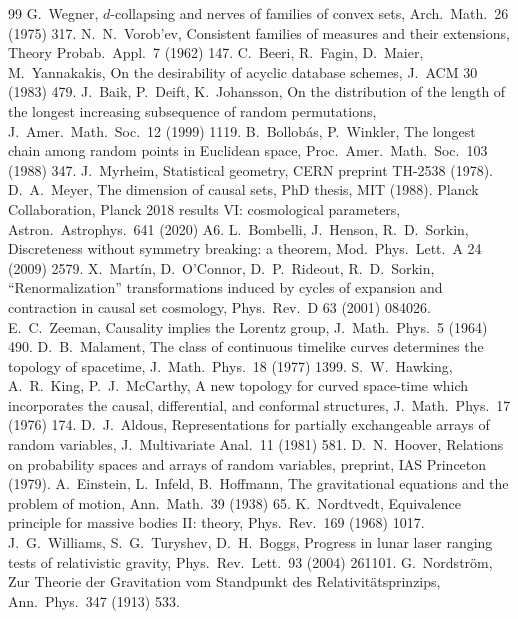 \documentclass[11pt]{article}
\theoremstyle{definition}
\theoremstyle{remark}
\begin{document}
\begin{thebibliography}{99}
 G.~Wegner, $d$-collapsing and nerves of families of convex sets, Arch.\ Math.\ 26 (1975) 317.
 N.~N.~Vorob'ev, Consistent families of measures and their extensions, Theory Probab.\ Appl.\ 7 (1962) 147.
 C.~Beeri, R.~Fagin, D.~Maier, M.~Yannakakis, On the desirability of acyclic database schemes, J.\ ACM 30 (1983) 479.
 J.~Baik, P.~Deift, K.~Johansson, On the distribution of the length of the longest increasing subsequence of random permutations, J.\ Amer.\ Math.\ Soc.\ 12 (1999) 1119.
 B.~Bollob\'as, P.~Winkler, The longest chain among random points in Euclidean space, Proc.\ Amer.\ Math.\ Soc.\ 103 (1988) 347.
 J.~Myrheim, Statistical geometry, CERN preprint TH-2538 (1978).
 D.~A.~Meyer, The dimension of causal sets, PhD thesis, MIT (1988).
 Planck Collaboration, Planck 2018 results VI: cosmological parameters, Astron.\ Astrophys.\ 641 (2020) A6.
 L.~Bombelli, J.~Henson, R.~D.~Sorkin, Discreteness without symmetry breaking: a theorem, Mod.\ Phys.\ Lett.\ A 24 (2009) 2579.
 X.~Mart\'in, D.~O'Connor, D.~P.~Rideout, R.~D.~Sorkin, ``Renormalization'' transformations induced by cycles of expansion and contraction in causal set cosmology, Phys.\ Rev.\ D 63 (2001) 084026.
 E.~C.~Zeeman, Causality implies the Lorentz group, J.\ Math.\ Phys.\ 5 (1964) 490.
 D.~B.~Malament, The class of continuous timelike curves determines the topology of spacetime, J.\ Math.\ Phys.\ 18 (1977) 1399.
 S.~W.~Hawking, A.~R.~King, P.~J.~McCarthy, A new topology for curved space-time which incorporates the causal, differential, and conformal structures, J.\ Math.\ Phys.\ 17 (1976) 174.
 D.~J.~Aldous, Representations for partially exchangeable arrays of random variables, J.\ Multivariate Anal.\ 11 (1981) 581.
 D.~N.~Hoover, Relations on probability spaces and arrays of random variables, preprint, IAS Princeton (1979).
 A.~Einstein, L.~Infeld, B.~Hoffmann, The gravitational equations and the problem of motion, Ann.\ Math.\ 39 (1938) 65.
 K.~Nordtvedt, Equivalence principle for massive bodies II: theory, Phys.\ Rev.\ 169 (1968) 1017.
 J.~G.~Williams, S.~G.~Turyshev, D.~H.~Boggs, Progress in lunar laser ranging tests of relativistic gravity, Phys.\ Rev.\ Lett.\ 93 (2004) 261101.
 G.~Nordstr\"om, Zur Theorie der Gravitation vom Standpunkt des Relativit\"atsprinzips, Ann.\ Phys.\ 347 (1913) 533.

\end{thebibliography}
\end{document}
